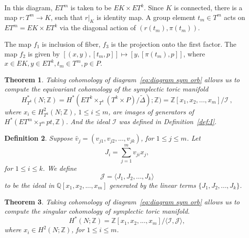 \documentclass[12pt]{amsart}
\newtheorem{theorem}{Theorem}[section]
\newtheorem{definition}[theorem]{Definition}
\theoremstyle{definition}
\numberwithin{equation}{section}
\begin{document}
In this diagram, $ET^m$ is taken to be $EK\times ET^k$. Since $K$ is
connected, there is a map $r: T^m\rightarrow K$, such that $r|_{K}$
is identity map. A group element  $t_m \in T^m$  acts on
$ET^m=EK\times ET^k$ via the diagonal action of $(r(t_m),\pi(t_m))$.

The map $f_1$ is inclusion of fiber, $f_3$ is the projection onto
the first factor. The map $f_2$ is given by $[(x,y),[t_m, p]]\mapsto
[y,[\pi(t_m),p]]$, where $x\in EK, y\in ET^k, t_m\in T^m, p\in P$.

\begin{theorem}\cite{DJ}\label{thm:symp orbi equi cohomology}
Taking cohomology of diagram~\eqref{eq:diagram sym orb} allows us to
compute the equivariant cohomology of the symplectic toric manifold
\begin{equation}
H_{T^k}^{*}(N;{{\mathbb{Z}}})=H^{*}(ET^k\times_{T^k}(T^k\times
P)/\tilde{\Delta});{{\mathbb{Z}}})= {{\mathbb{Z}}}[x_{1},x_{2},...,x_{m}]/{{\mathcal{I}}}\ ,
\end{equation}
where $x_{i}\in H_{T^k}^{2}(N;{{\mathbb{Z}}})$, $1\leq i\leq m$, are images of
generators of $H^{*}(ET^m\times_{T^m}pt, {{\mathbb{Z}}})$. And the ideal ${{\mathcal{I}}}$
was defined in Definition~\ref{def:I}.
\end{theorem}

\begin{definition}
Suppose $\tilde{v_{j}}=(v_{j1},v_{j2},...,v_{jk})$, for $1\leq j\leq
m$. Let
\begin{equation}J_{i}=\sum_{j=1}^{m}v_{ji}x_{j},
\end{equation}
for $1\leq i\leq k$. We define
\begin{equation}
{{\mathcal{J}}}=\langle J_{1},J_{2},...,J_{k}\rangle
\end{equation}
to be the ideal in ${{\mathbb{Q}}}[x_{1},x_{2},...,x_{m}]$ generated by the
linear terms $\{J_{1},J_{2},...,J_{k}\}$.
\end{definition}

\begin{theorem}\cite{DJ}\label{thm:symp orbi cohomology}
Taking cohomology of diagram~\eqref{eq:diagram sym orb} allows us to
compute the singular cohomology of symplectic toric manifold.
\begin{equation}
H^{*}(N;{{\mathbb{Z}}})={{\mathbb{Z}}}[x_{1},x_{2},...,x_{m}]/\langle {{\mathcal{I}}},{{\mathcal{J}}}\rangle ,
\end{equation}
where $x_{i}\in H^{2}(N;{{\mathbb{Z}}})$, for $1\leq i\leq m$.
\end{theorem}
\end{document}
